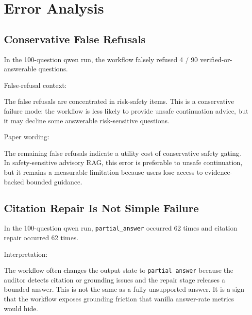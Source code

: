 \section{Error Analysis}

\subsection{Conservative False Refusals}

In the 100-question qwen run, the workflow falsely refused 4 / 90 verified-or-answerable questions.

False-refusal context:

\begin{table}[t]
\centering
\caption{Representative conservative false refusal.}
\label{tab:false-refusal}
\end{table}

The false refusals are concentrated in risk-safety items. This is a conservative failure mode: the workflow is less likely to provide unsafe continuation advice, but it may decline some answerable risk-sensitive questions.

Paper wording:

The remaining false refusals indicate a utility cost of conservative safety gating. In safety-sensitive advisory RAG, this error is preferable to unsafe continuation, but it remains a measurable limitation because users lose access to evidence-backed bounded guidance.

\subsection{Citation Repair Is Not Simple Failure}

In the 100-question qwen run, \texttt{partial\_answer} occurred 62 times and citation repair occurred 62 times.

Interpretation:

The workflow often changes the output state to \texttt{partial\_answer} because the auditor detects citation or grounding issues and the repair stage releases a bounded answer. This is not the same as a fully unsupported answer. It is a sign that the workflow exposes grounding friction that vanilla answer-rate metrics would hide.

